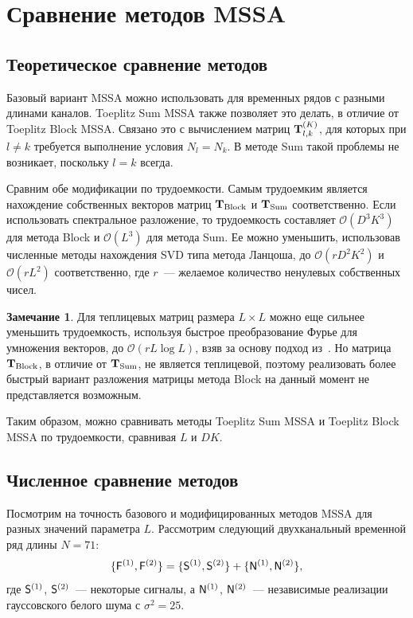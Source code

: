 \documentclass[specialist,
substylefile = spbu.rtx,
               subf,href,colorlinks=true,12pt]{disser}
\theoremstyle{definition}
\newtheorem{remark}{Замечание}
\begin{document}
\section{Сравнение методов MSSA}\label{sect:mssa_comparison}
\subsection{Теоретическое сравнение методов}
Базовый вариант MSSA можно использовать для временных рядов с разными длинами каналов. Toeplitz Sum MSSA также позволяет это делать, в отличие от Toeplitz Block MSSA. Связано это с вычислением матриц $\mathbf{T}_{l,k}^{(K)}$, для которых при $l\ne k$ требуется выполнение условия $N_l=N_k$. В методе Sum такой проблемы не возникает, поскольку $l=k$ всегда.

Сравним обе модификации по трудоемкости. Самым трудоемким является нахождение собственных векторов матриц $\mathbf{T}_{\text{Block}}$ и $\mathbf{T}_{\text{Sum}}$ соответственно. Если использовать спектральное разложение, то трудоемкость составляет $\mathcal{O}(D^3K^3)$ для метода Block и $\mathcal{O}(L^3)$ для метода Sum. Ее можно уменьшить, использовав численные методы нахождения SVD типа метода Ланцоша, до $\mathcal{O}(rD^2K^2)$ и $\mathcal{O}(rL^2)$ соответственно, где $r$~--- желаемое количество ненулевых собственных чисел.
\begin{remark}\label{remark:mssa_complexity}
	Для теплицевых матриц размера $L\times L$ можно еще сильнее уменьшить трудоемкость, используя быстрое преобразование Фурье для умножения векторов, до $\mathcal{O}(r L\log L)$, взяв за основу подход из~\cite{Korobeynikov2010,Golyandina2015}. Но матрица $\mathbf{T}_{\text{Block}}$, в отличие от $\mathbf{T}_{\text{Sum}}$, не является теплицевой, поэтому реализовать более быстрый вариант разложения матрицы метода Block на данный момент не представляется возможным.
\end{remark}
Таким образом, можно сравнивать методы Toeplitz Sum MSSA и Toeplitz Block MSSA по трудоемкости, сравнивая $L$ и $DK$.

\subsection{Численное сравнение методов}
Посмотрим на точность базового и модифицированных методов MSSA для разных значений параметра $L$. Рассмотрим следующий двухканальный временной ряд длины ${N=71}$:
$$\{\mathsf{F}^{(1)}, \mathsf{F}^{(2)}\}=\{\mathsf{S}^{(1)},\mathsf{S}^{(2)}\} + \{\mathsf{N}^{(1)},\mathsf{N}^{(2)}\},$$
где $\mathsf{S}^{(1)}$, $\mathsf{S}^{(2)}$~--- некоторые сигналы, а $\mathsf{N}^{(1)}$, $\mathsf{N}^{(2)}$~--- независимые реализации гауссовского белого шума с $\sigma^2=25$.
\end{document}
